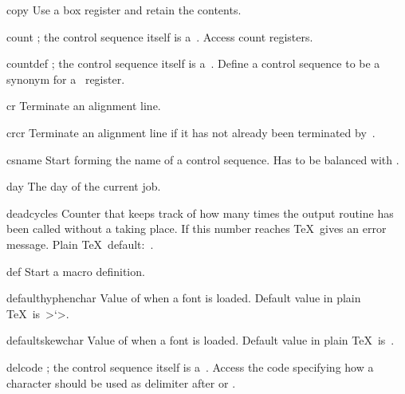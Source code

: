 \item copy
      Use a box register and retain the contents. 

\item count
      ; the control sequence itself
      is a~.
      Access count registers. 

\item countdef
      ; the control sequence
      itself is a~.
      Define a control sequence to be a synonym for
      a~ register.

\item cr
      Terminate an alignment line.

\item crcr
      Terminate an alignment line if it has 
      not already been terminated by~.

\item csname
      Start forming the name of a control sequence.
      Has to be balanced with .

\item day
      The day of the current job.

\item deadcycles
      Counter that keeps track of how many times 
      the output routine has been called without a  
      taking place. 
      If this number reaches  \TeX\
      gives an error message. Plain \TeX\ default:~.

\item def
       Start a macro definition.

\item defaulthyphenchar
      Value of  when a font is loaded.
      Default value in plain \TeX\ is~\ver>`\->.

\item defaultskewchar
      Value of  when a font is loaded.
      Default value in plain \TeX\ is~.

\item delcode
      ; the control sequence itself
      is a~.
      Access the
      code specifying how a character should be used as delimiter 
      after \cs{left} or \cs{right}.

